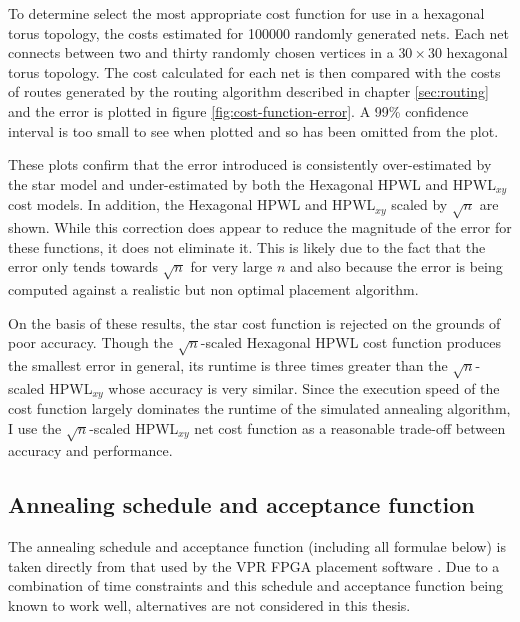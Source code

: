 			To determine select the most appropriate cost function for use in a
			hexagonal torus topology, the costs estimated for \num{100000} randomly
			generated nets. Each net connects between two and thirty randomly chosen
			vertices in a $30\times30$ hexagonal torus topology. The cost calculated
			for each net is then compared with the costs of routes generated by the
			routing algorithm described in chapter \ref{sec:routing} and the error is
			plotted in figure \ref{fig:cost-function-error}. A 99\% confidence
			interval is too small to see when plotted and so has been omitted from
			the plot.
			
			These plots confirm that the error introduced is consistently
			over-estimated by the star model and under-estimated by both the
			Hexagonal HPWL and HPWL${_{xy}}$ cost models. In addition, the Hexagonal
			HPWL and HPWL$_{xy}$ scaled by $\sqrt{n}$ are shown. While this
			correction does appear to reduce the magnitude of the error for these
			functions, it does not eliminate it. This is likely due to the fact that
			the error only tends towards $\sqrt{n}$ for very large $n$ \cite{chung79}
			and also because the error is being computed against a realistic but non
			optimal placement algorithm.
			
			On the basis of these results, the star cost function is rejected on the
			grounds of poor accuracy. Though the $\sqrt{n}$-scaled Hexagonal HPWL
			cost function produces the smallest error in general, its runtime is
			three times greater than the $\sqrt{n}$-scaled HPWL$_{xy}$ whose accuracy
			is very similar. Since the execution speed of the cost function largely
			dominates the runtime of the simulated annealing algorithm, I use the
			$\sqrt{n}$-scaled HPWL$_{xy}$ net cost function as a reasonable trade-off
			between accuracy and performance.
			
		\subsection{Annealing schedule and acceptance function}
			
			\label{sec:placement-schedule-acceptance}
			
			The annealing schedule  and acceptance function (including all formulae
			below) is taken directly from that used by the VPR FPGA placement
			software \cite{betz97}. Due to a combination of time constraints and this
			schedule and acceptance function being known to work well, alternatives
			are not considered in this thesis.
			
